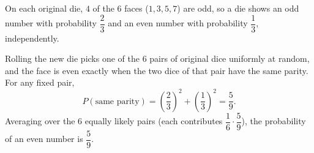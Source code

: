 On each original die, $4$ of the $6$ faces ($1,3,5,7$) are odd, so a die shows an odd number with probability $\dfrac23$ and an even number with probability $\dfrac13$, independently.

Rolling the new die picks one of the $6$ pairs of original dice uniformly at random, and the face is even exactly when the two dice of that pair have the same parity. For any fixed pair,
\[P(\text{same parity})=\left(\dfrac23\right)^2+\left(\dfrac13\right)^2=\dfrac59.\]
Averaging over the $6$ equally likely pairs (each contributes $\dfrac16\cdot\dfrac59$), the probability of an even number is $\boxed{\dfrac59}$.
